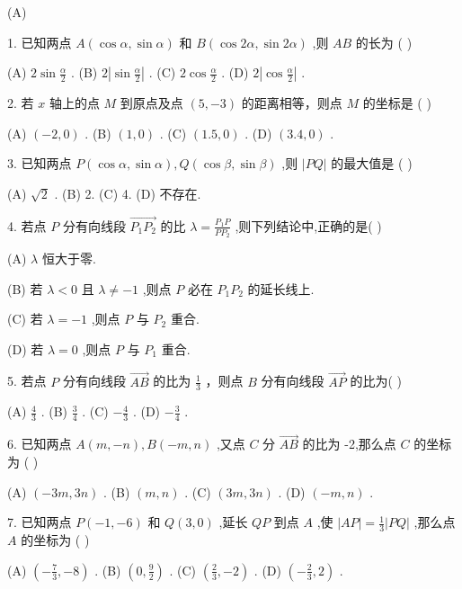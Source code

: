 \documentclass[10pt]{article}
\begin{document}
(A)

1. 已知两点 \(A\left( {\cos \alpha ,\sin \alpha }\right)\) 和 \(B\left( {\cos {2\alpha },\sin {2\alpha }}\right)\) ,则 \({AB}\) 的长为 ( )

(A) \(2\sin \frac{\alpha }{2}\) . (B) \(2\left| {\sin \frac{\alpha }{2}}\right|\) . (C) \(2\cos \frac{\alpha }{2}\) . (D) \(2\left| {\cos \frac{\alpha }{2}}\right|\) .

2. 若 \(x\) 轴上的点 \(M\) 到原点及点 \(\left( {5, - 3}\right)\) 的距离相等，则点 \(M\) 的坐标是 ( )

(A) \(\left( {-2,0}\right)\) . (B) \(\left( {1,0}\right)\) . (C) \(\left( {{1.5},0}\right)\) . (D) \(\left( {{3.4},0}\right)\) .

3. 已知两点 \(P\left( {\cos \alpha ,\sin \alpha }\right) ,Q\left( {\cos \beta ,\sin \beta }\right)\) ,则 \(\left| {PQ}\right|\) 的最大值是 ( )

(A) \(\sqrt{2}\) . (B) 2. (C) 4. (D) 不存在.

4. 若点 \(P\) 分有向线段 \(\overrightarrow{{P}_{1}{P}_{2}}\) 的比 \(\lambda  = \frac{{P}_{1}P}{P{P}_{2}}\) ,则下列结论中,正确的是(   )

(A) \(\lambda\) 恒大于零.

(B) 若 \(\lambda  < 0\) 且 \(\lambda  \neq   - 1\) ,则点 \(P\) 必在 \({P}_{1}{P}_{2}\) 的延长线上.

(C) 若 \(\lambda  =  - 1\) ,则点 \(P\) 与 \({P}_{2}\) 重合.

(D) 若 \(\lambda  = 0\) ,则点 \(P\) 与 \({P}_{1}\) 重合.

5. 若点 \(P\) 分有向线段 \(\overrightarrow{AB}\) 的比为 \(\frac{1}{3}\) ，则点 \(B\) 分有向线段 \(\overrightarrow{AP}\) 的比为( )

(A) \(\frac{4}{3}\) . (B) \(\frac{3}{4}\) . (C) \(- \frac{4}{3}\) . (D) \(- \frac{3}{4}\) .

6. 已知两点 \(A\left( {m, - n}\right) ,B\left( {-m,n}\right)\) ,又点 \(C\) 分 \(\overrightarrow{AB}\) 的比为 -2,那么点 \(C\) 的坐标为 ( )

(A) \(\left( {-{3m},{3n}}\right)\) . (B) \(\left( {m,n}\right)\) . (C) \(\left( {{3m},{3n}}\right)\) . (D) \(\left( {-m,n}\right)\) .

7. 已知两点 \(P\left( {-1, - 6}\right)\) 和 \(Q\left( {3,0}\right)\) ,延长 \({QP}\) 到点 \(A\) ,使 \(\left| {AP}\right|  = \frac{1}{3}\left| {PQ}\right|\) ,那么点 \(A\) 的坐标为 ( )

(A) \(\left( {-\frac{7}{3}, - 8}\right)\) . (B) \(\left( {0,\frac{9}{2}}\right)\) . (C) \(\left( {\frac{2}{3}, - 2}\right)\) . (D) \(\left( {-\frac{2}{3},2}\right)\) .
\end{document}
